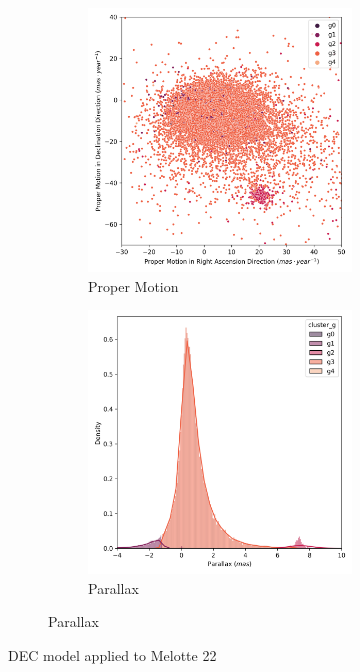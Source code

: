 \documentclass[11pt, a4paper, english]{book}
\begin{document}
\begin{figure}[htbp]
  \centering
  \begin{subfigure}{0.9\textwidth}
    \centering
    \begin{subfigure}[t]{0.45\textwidth}
      \centering
      \includegraphics[width=\textwidth]{../figures/melotte_22/dec_pm_melotte_22.png}
      \caption{Proper Motion}
    \end{subfigure}
    \hfill
    \begin{subfigure}[t]{0.45\textwidth}
      \centering
      \includegraphics[width=\textwidth]{../figures/melotte_22/dec_parallax_melotte_22.png}
      \caption{Parallax}
    \end{subfigure}
  \end{subfigure}
  \caption{DEC model applied to Melotte 22}
  \label{fig:dec_melotte_22}
\end{figure}
\end{document}
